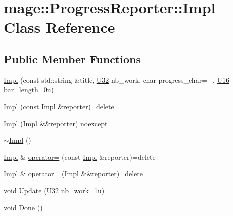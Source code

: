 \hypertarget{classmage_1_1_progress_reporter_1_1_impl}{}\section{mage\+:\+:Progress\+Reporter\+:\+:Impl Class Reference}
\label{classmage_1_1_progress_reporter_1_1_impl}
\subsection*{Public Member Functions}
\begin{DoxyCompactItemize}
\item 
\mbox{\hyperlink{classmage_1_1_progress_reporter_1_1_impl_ab6da9431b3faadf0715b69c11a0a578b}{Impl}} (const std\+::string \&title, \mbox{\hyperlink{namespacemage_aa5d6eaabaac3cdd01873d6a3d27e90f3}{U32}} nb\+\_\+work, char progress\+\_\+char=\textquotesingle{}+\textquotesingle{}, \mbox{\hyperlink{namespacemage_a1701f09b2c3ed62768e1b7d00bf30d0b}{U16}} bar\+\_\+length=0u)
\item 
\mbox{\hyperlink{classmage_1_1_progress_reporter_1_1_impl_af721b271934a492c3a47d8920d76c3c8}{Impl}} (const \mbox{\hyperlink{classmage_1_1_progress_reporter_1_1_impl}{Impl}} \&reporter)=delete
\item 
\mbox{\hyperlink{classmage_1_1_progress_reporter_1_1_impl_ab3b6811ed80a087ac10c90e97730147c}{Impl}} (\mbox{\hyperlink{classmage_1_1_progress_reporter_1_1_impl}{Impl}} \&\&reporter) noexcept
\item 
\mbox{\hyperlink{classmage_1_1_progress_reporter_1_1_impl_af5dbbaa059fdfc22e90e274ba14053a8}{$\sim$\+Impl}} ()
\item 
\mbox{\hyperlink{classmage_1_1_progress_reporter_1_1_impl}{Impl}} \& \mbox{\hyperlink{classmage_1_1_progress_reporter_1_1_impl_a18d90c9b1c400d83d8c3a1ba54b23d69}{operator=}} (const \mbox{\hyperlink{classmage_1_1_progress_reporter_1_1_impl}{Impl}} \&reporter)=delete
\item 
\mbox{\hyperlink{classmage_1_1_progress_reporter_1_1_impl}{Impl}} \& \mbox{\hyperlink{classmage_1_1_progress_reporter_1_1_impl_a39801a31c5265467a8056f2bb125cf39}{operator=}} (\mbox{\hyperlink{classmage_1_1_progress_reporter_1_1_impl}{Impl}} \&\&reporter)=delete
\item 
void \mbox{\hyperlink{classmage_1_1_progress_reporter_1_1_impl_a89d8090c7280c12a046c03df8dc7d7b3}{Update}} (\mbox{\hyperlink{namespacemage_aa5d6eaabaac3cdd01873d6a3d27e90f3}{U32}} nb\+\_\+work=1u)
\item 
void \mbox{\hyperlink{classmage_1_1_progress_reporter_1_1_impl_a58a0fb3d0e5f164fc36ad7416bb98d2d}{Done}} ()
\end{DoxyCompactItemize}
